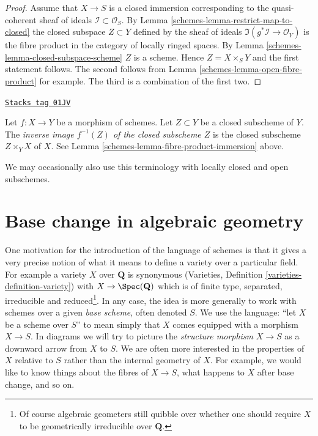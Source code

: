 \begin{proof}

Assume that $X \to S$ is a closed immersion corresponding
to the quasi-coherent sheaf of ideals $\mathcal{I} \subset \mathcal{O}_S$.
By Lemma \ref{schemes-lemma-restrict-map-to-closed} the closed subspace
$Z \subset Y$ defined by the sheaf of ideals
$\Im(g^*\mathcal{I} \to \mathcal{O}_Y)$ is the fibre product
in the category of locally ringed spaces.
By Lemma \ref{schemes-lemma-closed-subspace-scheme} $Z$ is a scheme.
Hence $Z = X \times_S Y$ and the first statement follows.
The second follows from Lemma \ref{schemes-lemma-open-fibre-product}
for example. The third is a combination of
the first two.
\end{proof}

\begin{definition}
\label{schemes-definition-inverse-image-closed-subscheme}
\href{https://stacks.math.columbia.edu/tag/01JV}{\texttt{Stacks tag 01JV}}

Let $f : X \to Y$ be a morphism of schemes. Let $Z \subset Y$ be a
closed subscheme of $Y$. The {\it inverse image $f^{-1}(Z)$ of the
closed subscheme $Z$} is the closed subscheme $Z \times_Y X$ of
$X$. See Lemma \ref{schemes-lemma-fibre-product-immersion} above.
\end{definition}

We may occasionally also use this terminology with locally closed and
open subschemes.

\section{Base change in algebraic geometry}
\label{schemes-section-base-change}
One motivation for the introduction of the language of schemes
is that it gives a very precise notion of what it means to
define a variety over a particular field. For example a variety
$X$ over $\mathbf{Q}$ is synonymous
(Varieties, Definition \ref{varieties-definition-variety})
with $X \to \Spec(\mathbf{Q})$ which is of finite type,
separated, irreducible and reduced\footnote{Of course algebraic
geometers still quibble over whether one should require $X$ to be
geometrically irreducible over $\mathbf{Q}$.}. In any case, the idea
is more generally to work with schemes over a given {\it base scheme},
often denoted $S$. We use the language: ``let $X$ be a scheme over $S$''
to mean simply that $X$ comes equipped with a morphism $X \to S$.
In diagrams we will try to picture the {\it structure morphism}
$X \to S$ as a downward arrow from $X$ to $S$.
We are often more interested in the properties of $X$ relative
to $S$ rather than the internal geometry of $X$.
For example, we would like to know things about the fibres of $X \to S$,
what happens to $X$ after base change, and so on.

